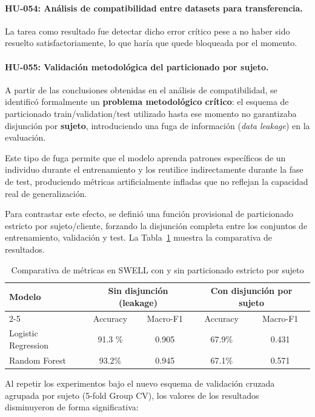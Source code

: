 \documentclass{report}
\begin{document}
\paragraph{HU-054: Análisis de compatibilidad entre datasets para transferencia.}
La tarea como resultado fue detectar dicho error crítico pese a no haber sido resuelto satisfactoriamente, lo que haría que quede bloqueada por el momento.

\paragraph{HU-055: Validación metodológica del particionado por sujeto.}
A partir de las conclusiones obtenidas en el análisis de compatibilidad, se identificó formalmente un \textbf{problema metodológico crítico}: el esquema de particionado train/validation/test utilizado hasta ese momento no garantizaba disjunción por \textbf{sujeto}, introduciendo una fuga de información (\emph{data leakage}) en la evaluación.

Este tipo de fuga permite que el modelo aprenda patrones específicos de un individuo durante el entrenamiento y los reutilice indirectamente durante la fase de test, produciendo métricas artificialmente infladas que no reflejan la capacidad real de generalización.

Para contrastar este efecto, se definió una función provisional de particionado estricto por sujeto/cliente, forzando la disjunción completa entre los conjuntos de entrenamiento, validación y test. La Tabla~\ref{tab:leakage-comparison} muestra la comparativa de resultados.

\begin{table}[H]
\centering
\begin{tabular}{|l|c|c|c|c|}
\hline
\multirow{2}{*}{\textbf{Modelo}} & \multicolumn{2}{c|}{\textbf{Sin disjunción (leakage)}} & \multicolumn{2}{c|}{\textbf{Con disjunción por sujeto}} \\
\cline{2-5}
 & Accuracy & Macro-F1 & Accuracy & Macro-F1 \\
\hline
Logistic Regression & 91.3 \% & 0.905 & 67.9\% & 0.431 \\
Random Forest & 93.2\% & 0.945 & 67.1\% & 0.571 \\
\hline
\end{tabular}
\caption{Comparativa de métricas en SWELL con y sin particionado estricto por sujeto}
\label{tab:leakage-comparison}
\end{table}

Al repetir los experimentos bajo el nuevo esquema de validación cruzada agrupada por sujeto (5-fold Group CV), los valores de los resultados disminuyeron de forma significativa:
\end{document}
